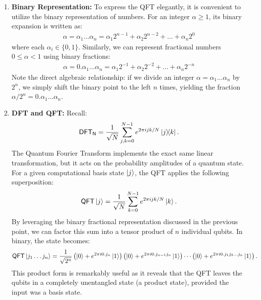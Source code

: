 \begin{enumerate}
    \item \textbf{Binary Representation:} 
    To express the QFT elegantly, it is convenient to utilize the binary representation of numbers. For an integer $\alpha \geq 1$, its binary expansion is written as:
    \begin{align*}
        \alpha = \alpha_1\dots\alpha_n = \alpha_1 2^{n-1} + \alpha_2 2^{n-2} + \dots + \alpha_n 2^0
    \end{align*}
    where each $\alpha_i \in \{0, 1\}$. 
    Similarly, we can represent fractional numbers $0 \leq \alpha < 1$ using binary fractions:
    \begin{align*}
        \alpha = 0.\alpha_1\dots\alpha_n = \alpha_1 2^{-1} + \alpha_2 2^{-2} + \dots + \alpha_n 2^{-n}
    \end{align*}
    Note the direct algebraic relationship: if we divide an integer $\alpha = \alpha_1\dots\alpha_n$ by $2^n$, we simply shift the binary point to the left $n$ times, yielding the fraction $\alpha/2^n = 0.\alpha_1\dots\alpha_n$.

    \item \textbf{DFT and QFT:}
    Recall:
    \begin{align*}
        \mathsf{DFT_N} = \frac{1}{\sqrt{N}} \sum_{j,k=0}^{N-1} e^{2\pi ijk/N} \ketbra{j}{k}.
    \end{align*}
    The Quantum Fourier Transform implements the exact same linear transformation, but it acts on the probability amplitudes of a quantum state. For a given computational basis state $\ket{j}$, the QFT applies the following superposition:
    \begin{align*}
        \mathsf{QFT}\ket{j} = \frac{1}{\sqrt{N}} \sum_{k=0}^{N-1} e^{2\pi ijk/N} \ket{k}.
    \end{align*}
    By leveraging the binary fractional representation discussed in the previous point, we can factor this sum into a tensor product of $n$ individual qubits. In binary, the state becomes:
    \begin{align*}
        \mathsf{QFT}\ket{j_1\dots j_n} = \frac{1}{\sqrt{2^n}}\left( \ket{0}+e^{2\pi i0.j_n}\ket{1} \right)\left( \ket{0}+e^{2\pi i0.j_{n-1}j_n}\ket{1} \right)\cdots \left( \ket{0}+e^{2\pi i0.j_1j_2\dots j_n}\ket{1}\right).
    \end{align*}
    This product form is remarkably useful as it reveals that the QFT leaves the qubits in a completely unentangled state (a product state), provided the input was a basis state.


\end{enumerate}
